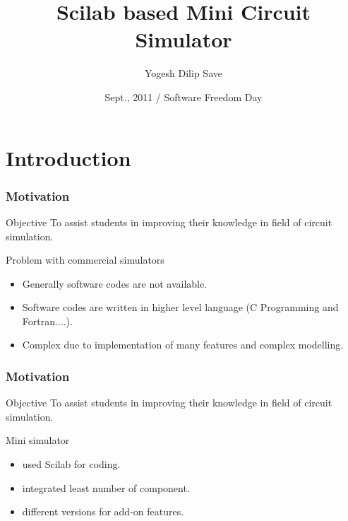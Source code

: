 \documentclass{beamer}
\title
{Scilab based Mini Circuit Simulator}
\author[]
{Yogesh Dilip Save}
\institute
{
  Department of Electrical Engineering\\
  Indian Institute of Technology, Bombay
}
\date[seminar] %
{Sept., 2011 / \small{Software Freedom Day}}
\begin{document}
\begin{frame}
  \titlepage
\end{frame}

\section{Introduction}
\begin{frame}
 \frametitle{Motivation}
\begin{block}{Objective}
To assist students in improving their knowledge in field of circuit simulation.
\end{block}
\begin{block}{Problem with commercial simulators}
\begin{itemize}
\item Generally software codes are not available.
\item Software codes are written in higher level language (C Programming and Fortran....).
\item Complex due to implementation of many features and complex modelling.
\end{itemize}
\end{block}
\end{frame}

\begin{frame}
 \frametitle{Motivation}
\begin{block}{Objective}
To assist students in improving their knowledge in field of circuit simulation.
\end{block}
\begin{block}{Mini simulator}
\begin{itemize}
\item used Scilab for coding.
\item integrated least number of component.  
\item different versions for add-on features. 
\end{itemize} 
\end{block}
\end{frame}
\end{document}
